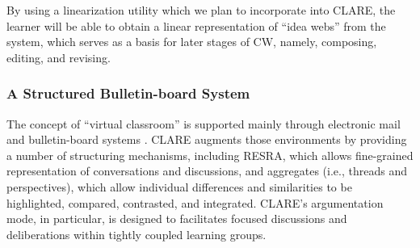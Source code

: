 By using a linearization utility which we plan to incorporate into CLARE,
the learner will be able to obtain a linear representation of ``idea webs''
from the system, which serves as a basis for later stages of CW, namely,
composing, editing, and revising.


\subsubsection{A Structured Bulletin-board System}
\label{sec:bbs}

The concept of ``virtual classroom'' is supported mainly through
electronic mail and bulletin-board systems \cite{HILTZ88Collaborative}.
CLARE augments those environments by providing a number of structuring
mechanisms, including RESRA, which allows fine-grained representation of
conversations and discussions, and aggregates (i.e., threads and
perspectives), which allow individual differences and similarities to be
highlighted, compared, contrasted, and integrated. CLARE's argumentation
mode, in particular, is designed to facilitates focused discussions and
deliberations within tightly coupled learning groups.










